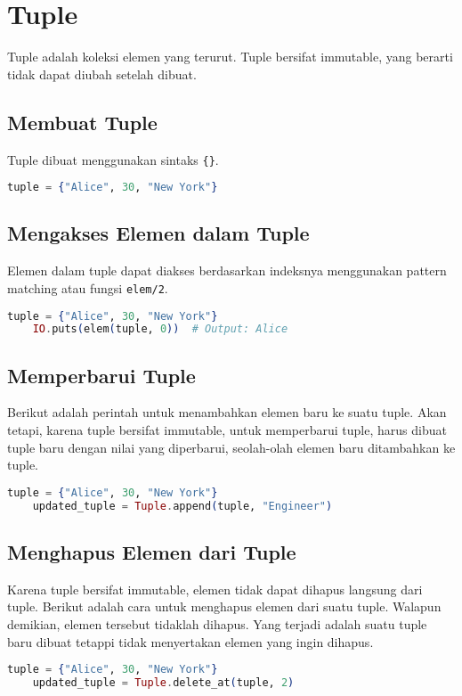 \section{Tuple}
Tuple adalah koleksi elemen yang terurut. Tuple bersifat immutable, yang berarti tidak dapat diubah setelah dibuat.

\subsection{Membuat Tuple}
Tuple dibuat menggunakan sintaks \texttt{\{\}}.
\begin{lstlisting}[language=Elixir]
	tuple = {"Alice", 30, "New York"}
\end{lstlisting}

\subsection{Mengakses Elemen dalam Tuple}
Elemen dalam tuple dapat diakses berdasarkan indeksnya menggunakan pattern matching atau fungsi \texttt{elem/2}.
\begin{lstlisting}[language=Elixir]
	tuple = {"Alice", 30, "New York"}
	IO.puts(elem(tuple, 0))  # Output: Alice
\end{lstlisting}

\subsection{Memperbarui Tuple}
Berikut adalah perintah untuk menambahkan elemen baru ke suatu tuple. Akan tetapi, karena tuple bersifat immutable, untuk memperbarui tuple, harus dibuat tuple baru dengan nilai yang diperbarui, seolah-olah elemen baru ditambahkan ke tuple.
\begin{lstlisting}[language=Elixir]
	tuple = {"Alice", 30, "New York"}
	updated_tuple = Tuple.append(tuple, "Engineer")
\end{lstlisting}

\subsection{Menghapus Elemen dari Tuple}
Karena tuple bersifat immutable, elemen tidak dapat dihapus langsung dari tuple. Berikut adalah cara untuk menghapus elemen dari suatu tuple. Walapun demikian, elemen tersebut tidaklah dihapus. Yang terjadi adalah suatu tuple baru dibuat tetappi tidak menyertakan elemen yang ingin dihapus.

\begin{lstlisting}[language=Elixir]
	tuple = {"Alice", 30, "New York"}
	updated_tuple = Tuple.delete_at(tuple, 2)
\end{lstlisting}

